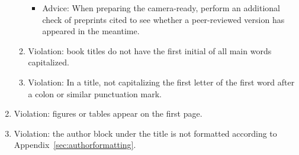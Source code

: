 \documentclass[11pt,a4paper]{article}
\begin{document}
\begin{enumerate}
\begin{enumerate}
\begin{itemize}
     \item Advice: When preparing the camera-ready, perform an additional check
     of preprints cited to see whether a peer-reviewed version has appeared
     in the meantime.
  \end{itemize}
  \item Violation: book titles do not have the first initial of all main words
  capitalized.
  \item Violation: In a title, not capitalizing the first letter of the first word
  after a colon or similar punctuation mark.
\end{enumerate}
\item Violation: figures or tables appear on the first page.
  \item Violation: the author block under the title is not
    formatted according to Appendix~\ref{sec:authorformatting}.
\end{enumerate}
\else
\end{document}
